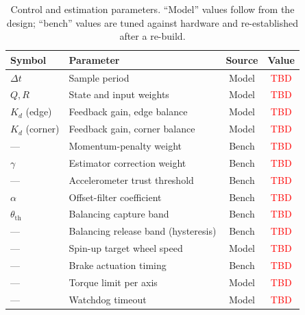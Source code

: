 \begin{table}[h]
\centering
\caption{Control and estimation parameters. ``Model'' values follow from the
design; ``bench'' values are tuned against hardware and re-established after a
re-build.}
\label{tab:control_params}
\small
\begin{tabular}{l L{5.4cm} c c}
\toprule
Symbol & Parameter & Source & Value \\
\midrule
$\Delta t$        & Sample period                      & Model & \textcolor{red}{TBD} \\
$Q, R$            & State and input weights            & Model & \textcolor{red}{TBD} \\
$K_d$ (edge)      & Feedback gain, edge balance        & Model & \textcolor{red}{TBD} \\
$K_d$ (corner)    & Feedback gain, corner balance      & Model & \textcolor{red}{TBD} \\
---               & Momentum-penalty weight            & Bench & \textcolor{red}{TBD} \\
$\gamma$          & Estimator correction weight        & Bench & \textcolor{red}{TBD} \\
---               & Accelerometer trust threshold      & Bench & \textcolor{red}{TBD} \\
$\alpha$          & Offset-filter coefficient          & Bench & \textcolor{red}{TBD} \\
$\theta_{\text{th}}$ & Balancing capture band          & Bench & \textcolor{red}{TBD} \\
---               & Balancing release band (hysteresis)& Bench & \textcolor{red}{TBD} \\
---               & Spin-up target wheel speed         & Model & \textcolor{red}{TBD} \\
---               & Brake actuation timing             & Bench & \textcolor{red}{TBD} \\
---               & Torque limit per axis              & Model & \textcolor{red}{TBD} \\
---               & Watchdog timeout                   & Model & \textcolor{red}{TBD} \\
\bottomrule
\end{tabular}
\end{table}
